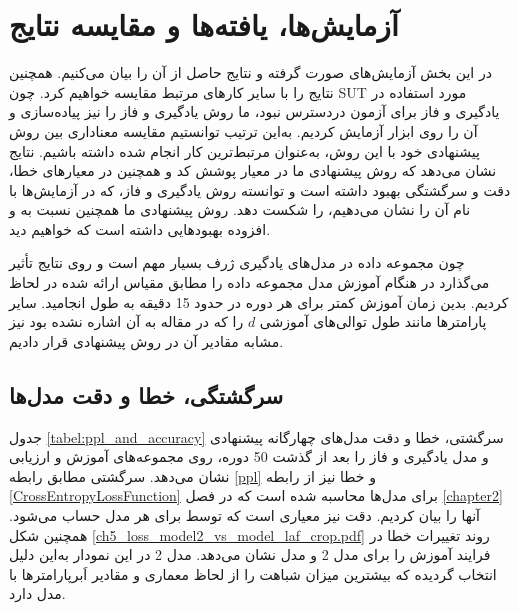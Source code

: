  
 
 
 
 
\section{آزمایش‌ها، یافته‌ها و مقایسه نتایج} 
 در این بخش آزمایش‌های  صورت گرفته و نتایج حاصل از آن را بیان می‌کنیم. همچنین نتایج را با سایر کارهای مرتبط مقایسه خواهیم کرد. 
 چون \gls{SUT} مورد استفاده در یادگیری و فاز 
 \cite{Godefroid:2017:LML:3155562.3155573}
 برای آزمون دردسترس نبود، ما روش یادگیری و فاز را نیز پیاده‌سازی و آن را روی ابزار  آزمایش کردیم. به‌این ترتیب توانستیم مقایسه معناداری بین روش پیشنهادی خود با این روش، به‌عنوان مرتبط‌ترین کار انجام شده داشته باشیم. نتایج نشان می‌دهد که روش پیشنهادی ما در معیار پوشش کد و همچنین در معیارهای خطا، دقت و سرگشتگی بهبود داشته است و توانسته روش یادگیری و فاز، که در آزمایش‌ها با نام  آن را نشان می‌دهیم، را شکست دهد. روش پیشنهادی ما همچنین نسبت به  و افزوده بهبودهایی داشته است که خواهیم دید.
 
 چون مجموعه داده در مدل‌های یادگیری ژرف بسیار مهم است و روی نتایج تأثیر می‌گذارد در هنگام آموزش مدل  مجموعه داده را مطابق مقیاس ارائه شده در 
 \cite{Godefroid:2017:LML:3155562.3155573}
 لحاظ کردیم. بدین زمان آموزش کمتر برای هر دوره در حدود 15 دقیقه به طول انجامید. سایر پارامترها مانند طول توالی‌های آموزشی $d$ را که در مقاله به آن اشاره نشده بود نیز مشابه مقادیر آن در روش پیشنهادی قرار دادیم.
 
 
 \subsection{سرگشتگی، خطا و دقت مدل‌ها}
 
 جدول \ref{tabel:ppl_and_accuracy} سرگشتی، خطا و دقت مدل‌های چهارگانه پیشنهادی و مدل یادگیری و فاز را بعد از گذشت 50 دوره، روی مجموعه‌های آموزش و ارزیابی نشان می‌دهد. سرگشتی مطابق رابطه \ref{ppl} و خطا نیز از رابطه \ref{CrossEntropyLossFunction} برای مدل‌ها محاسبه شده است که در فصل \ref{chapter2} آنها را بیان کردیم. دقت نیز معیاری است که توسط  برای هر مدل حساب می‌شود. همچنین  شکل \ref{ch5_loss_model2_vs_model_laf_crop.pdf} روند تغییرات خطا در فرایند آموزش را برای مدل 2 و مدل   نشان می‌دهد. مدل 2 در این نمودار به‌این دلیل انتخاب گردیده که بیشترین میزان شباهت را از لحاظ معماری و مقادیر اَبرپارامترها با مدل  دارد. 
 
